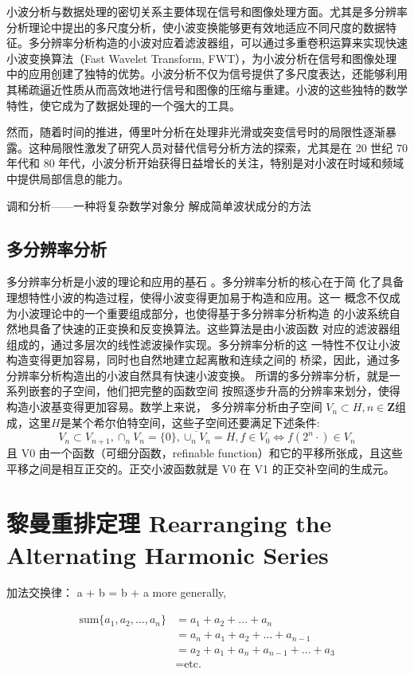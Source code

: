 \documentclass{ctexart}
\begin{document}
小波分析与数据处理的密切关系主要体现在信号和图像处理方面。尤其是多分辨率分析理论中提出的多尺度分析，使小波变换能够更有效地适应不同尺度的数据特征。多分辨率分析构造的小波对应着滤波器组，可以通过多重卷积运算来实现快速小波变换算法（Fast Wavelet Transform, FWT），为小波分析在信号和图像处理中的应用创建了独特的优势。小波分析不仅为信号提供了多尺度表达，还能够利用其稀疏逼近性质从而高效地进行信号和图像的压缩与重建。小波的这些独特的数学特性，使它成为了数据处理的一个强大的工具。

然而，随着时间的推进，傅里叶分析在处理非光滑或突变信号时的局限性逐渐暴露。这种局限性激发了研究人员对替代信号分析方法的探索，尤其是在 20 世纪 70 年代和 80 年代，小波分析开始获得日益增长的关注，特别是对小波在时域和频域中提供局部信息的能力。

调和分析——一种将复杂数学对象分
 解成简单波状成分的方法
 
\subsection{多分辨率分析}
多分辨率分析是小波的理论和应用的基石
。多分辨率分析的核心在于简
化了具备理想特性小波的构造过程，使得小波变得更加易于构造和应用。这一
概念不仅成为小波理论中的一个重要组成部分，也使得基于多分辨率分析构造
的小波系统自然地具备了快速的正变换和反变换算法。这些算法是由小波函数
对应的滤波器组组成的，通过多层次的线性滤波操作实现。多分辨率分析的这
一特性不仅让小波构造变得更加容易，同时也自然地建立起离散和连续之间的
桥梁，因此，通过多分辨率分析构造出的小波自然具有快速小波变换。
所谓的多分辨率分析，就是一系列嵌套的子空间，他们把完整的函数空间
按照逐步升高的分辨率来划分，使得构造小波基变得更加容易。数学上来说，
多分辨率分析由子空间 \(V_n \subset H, n \in \mathbf{Z} \)组成，这里\(H\)是某个希尔伯特空间，这些子空间还要满足下述条件:
\[ V_n \subset V_{n+1}, \cap_n V_n = \{0 \}, \overline{\cup_n V_n}=H, f \in V_0 \iff f(2^n \cdot ) \in V_n  \]
且 V0 由一个函数（可细分函数，refinable function）和它的平移所张成，且这些
平移之间是相互正交的。正交小波函数就是 V0 在 V1 的正交补空间的生成元。


\section{黎曼重排定理 Rearranging the Alternating Harmonic Series}

加法交换律：  a + b = b + a 
more generally, 

\begin{align*}
\text{sum}\{a_1, a_2, \dots, a_n\} &= a_1 + a_2 + \dots + a_n \\
&= a_n + a_1 + a_2 + \dots + a_{n-1} \\
&= a_2 + a_1 + a_n + a_{n-1} + \dots + a_3 \\
&= \text{etc.}
\end{align*}
\end{document}
